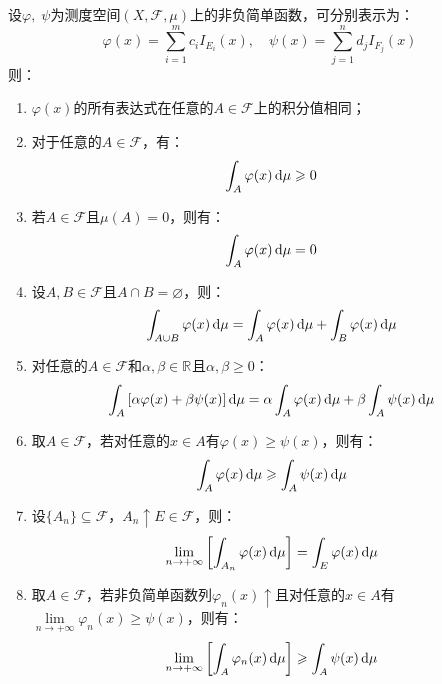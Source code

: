 \begin{property}\label{prop:NonnegativeSimpleIntegral}
	设$\varphi,\;\psi$为测度空间$(X,\mathscr{F},\mu)$上的非负简单函数，可分别表示为：
	\begin{equation*}
		\varphi(x)=\sum_{i=1}^{m}c_iI_{E_i}(x),\quad
		\psi(x)=\sum_{j=1}^{n}d_jI_{F_j}(x)
	\end{equation*}
	则：
	\begin{enumerate}
		\item $\varphi(x)$的所有表达式在任意的$A\in \mathscr{F}$上的积分值相同；
		\item 对于任意的$A\in \mathscr{F}$，有：
		\begin{equation*}
			\int_{A}^{}\varphi(x)\mathop{}\!\mathrm{d} \mu\geqslant0
		\end{equation*}
		\item 若$A\in \mathscr{F}$且$\mu(A)=0$，则有：
		\begin{equation*}
			\int_{A}^{}\varphi(x)\mathop{}\!\mathrm{d}\mu=0
		\end{equation*}
		\item 设$A,B\in \mathscr{F}$且$A\cap B=\varnothing$，则：
		\begin{equation*}
			\int_{A\cup B}\varphi(x)\mathop{}\!\mathrm{d}\mu=\int_{A}\varphi(x)\mathop{}\!\mathrm{d}\mu+\int_{B}\varphi(x)\mathop{}\!\mathrm{d}\mu
		\end{equation*}
		\item 对任意的$A\in \mathscr{F}$和$\alpha,\beta\in \mathbb{R}^{}$且$\alpha,\beta\geqslant0$：
		\begin{equation*}
			\int_{A}\left[\alpha\varphi(x)+\beta\psi(x)\right]\mathop{}\!\mathrm{d}\mu
			=\alpha\int_{A}\varphi(x)\mathop{}\!\mathrm{d}\mu+\beta\int_{A}\psi(x)\mathop{}\!\mathrm{d}\mu
		\end{equation*}
		\item 取$A\in \mathscr{F}$，若对任意的$x\in A$有$\varphi(x)\geqslant \psi(x)$，则有：
		\begin{equation*}
			\int_{A}^{}\varphi(x)\mathop{}\!\mathrm{d}\mu\geqslant\int_{A}^{}\psi(x)\mathop{}\!\mathrm{d}\mu
		\end{equation*}
		\item 设$\{A_n\}\subseteq\mathscr{F}$，$A_n\uparrow E\in \mathscr{F}$，则：
		\begin{equation*}
			\lim_{n\to+\infty}\left[\int_{A_n}\varphi(x)\mathop{}\!\mathrm{d}\mu\right]=\int_{E}\varphi(x)\mathop{}\!\mathrm{d}\mu
		\end{equation*}
		\item 取$A\in \mathscr{F}$，若非负简单函数列$\varphi_n(x)\uparrow$且对任意的$x\in A$有$\lim\limits_{n\to+\infty}\varphi_n(x)\geqslant \psi(x)$，则有：
		\begin{equation*}
			\lim_{n\to+\infty}\left[\int_{A}^{}\varphi_n(x)\mathop{}\!\mathrm{d}\mu\right]\geqslant\int_{A}^{}\psi(x)\mathop{}\!\mathrm{d}\mu
		\end{equation*}
	\end{enumerate}
\end{property}
